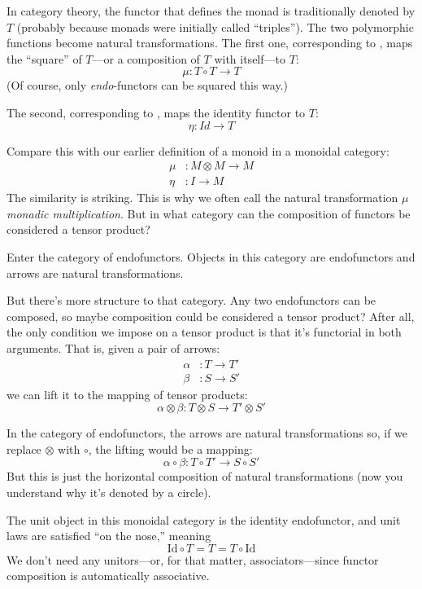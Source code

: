 \documentclass[DaoFP]{subfiles}
\begin{document}
In category theory, the functor that defines the monad is traditionally denoted by $T$ (probably because monads were initially called ``triples''). The two polymorphic functions become natural transformations. The first one, corresponding to , maps the ``square'' of $T$---or a composition of $T$ with itself---to $T$:
\[ \mu \colon T \circ T \to T \]
(Of course, only \emph{endo}-functors can be squared this way.) 

The second, corresponding to , maps the identity functor to $T$:
\[ \eta \colon Id \to T \]

Compare this with our earlier definition of a monoid in a monoidal category:
\begin{align*}
\mu &\colon M \otimes M \to M \\
\eta &\colon I \to M
\end{align*}
The similarity is striking. This is why we often call the natural transformation $\mu$ \emph{monadic multiplication}. But in what category can the composition of functors be considered a tensor product? 

Enter the category of endofunctors. Objects in this category are endofunctors and arrows are natural transformations. 

But there's more structure to that category. Any two endofunctors can be composed, so maybe composition could be considered a tensor product? After all, the only condition we impose on a tensor product is that it's functorial in both arguments. That is, given a pair of arrows:
\begin{align*}
 \alpha &\colon T \to T' \\
 \beta &\colon S \to S' 
\end{align*}
 we can lift it to the mapping of tensor products:
 \[ \alpha \otimes \beta \colon T \otimes S \to T' \otimes S' \]
 
 In the category of endofunctors, the arrows are natural transformations so, if we replace $\otimes$ with $\circ$, the lifting would be a mapping:
\[ \alpha \circ \beta \colon T \circ T' \to S \circ S' \]
But this is just the horizontal composition of natural transformations (now you understand why it's denoted by a circle).

The unit object in this monoidal category is the identity endofunctor, and unit laws are satisfied ``on the nose,'' meaning
\[ \text{Id} \circ T = T = T \circ \text{Id}\]
We don't need any unitors---or, for that matter, associators---since functor composition is automatically associative. 
\end{document}
